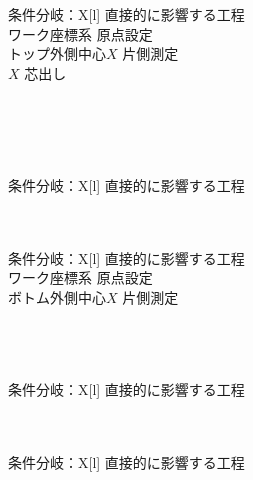 \begin{multicollongtblr}{条件分岐：\PMTopOutcutExists}{X[l]}
直接的に影響する工程\\
ワーク座標系 原点設定\\
トップ外側中心$X$ 片側測定\\
\KeywayCenter$X$ 芯出し\\
\TopOutcutMilling\\
\KeywayMilling\\
\TopEndFaceOutChamferMilling\\
\CenterlineEndFaceDifMeasurement\\
\end{multicollongtblr}

\begin{multicollongtblr}{条件分岐：\PMTopOutcutEndKeywayExists}{X[l]}
直接的に影響する工程\\
\TopOutcutMilling\\
\TopCurvedOutcutMilling\\
\end{multicollongtblr}

\begin{multicollongtblr}{条件分岐：\PMBottomOutcutExists}{X[l]}
直接的に影響する工程\\
ワーク座標系 原点設定\\
ボトム外側中心$X$ 片側測定\\
\BottomOutcutMilling\\
\BottomEndFaceOutChamferMilling\\
\CenterlineEndFaceDifMeasurement\\
\end{multicollongtblr}

\begin{multicollongtblr}{条件分岐：\PMSquareEndMillTaperExists}{X[l]}
直接的に影響する工程\\
\OutcutMilling\\
\CurvedOutcutMilling\\
\end{multicollongtblr}

\begin{multicollongtblr}{条件分岐：\PMOutcutCenterReference}{X[l]}
直接的に影響する工程\\
\CenterlineEndFaceDifMeasurement\\
\end{multicollongtblr}



